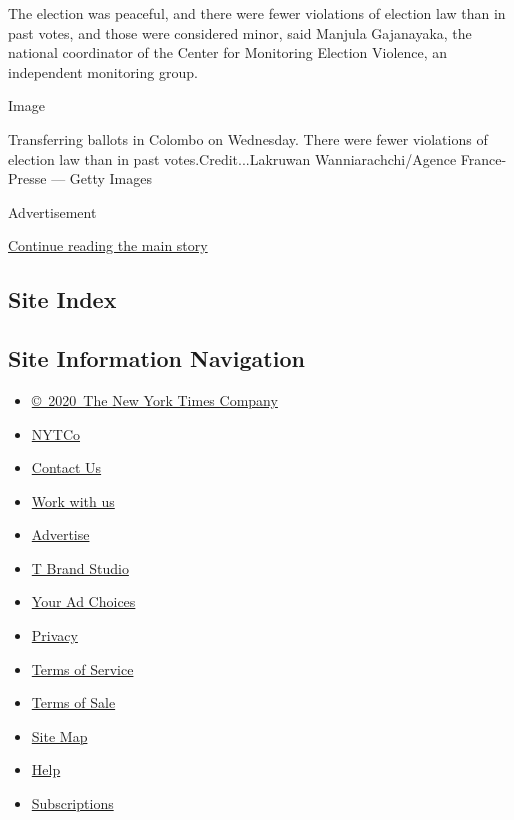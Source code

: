 The election was peaceful, and there were fewer violations of election
law than in past votes, and those were considered minor, said Manjula
Gajanayaka, the national coordinator of the Center for Monitoring
Election Violence, an independent monitoring group.

Image

Transferring ballots in Colombo on Wednesday. There were fewer
violations of election law than in past votes.Credit...Lakruwan
Wanniarachchi/Agence France-Presse --- Getty Images

Advertisement

\protect\hyperlink{after-bottom}{Continue reading the main story}

\hypertarget{site-index}{%
\subsection{Site Index}\label{site-index}}

\hypertarget{site-information-navigation}{%
\subsection{Site Information
Navigation}\label{site-information-navigation}}

\begin{itemize}
\tightlist
\item
  \href{https://help.nytimes3xbfgragh.onion/hc/en-us/articles/115014792127-Copyright-notice}{©~2020~The
  New York Times Company}
\end{itemize}

\begin{itemize}
\tightlist
\item
  \href{https://www.nytco.com/}{NYTCo}
\item
  \href{https://help.nytimes3xbfgragh.onion/hc/en-us/articles/115015385887-Contact-Us}{Contact
  Us}
\item
  \href{https://www.nytco.com/careers/}{Work with us}
\item
  \href{https://nytmediakit.com/}{Advertise}
\item
  \href{http://www.tbrandstudio.com/}{T Brand Studio}
\item
  \href{https://www.nytimes3xbfgragh.onion/privacy/cookie-policy\#how-do-i-manage-trackers}{Your
  Ad Choices}
\item
  \href{https://www.nytimes3xbfgragh.onion/privacy}{Privacy}
\item
  \href{https://help.nytimes3xbfgragh.onion/hc/en-us/articles/115014893428-Terms-of-service}{Terms
  of Service}
\item
  \href{https://help.nytimes3xbfgragh.onion/hc/en-us/articles/115014893968-Terms-of-sale}{Terms
  of Sale}
\item
  \href{https://spiderbites.nytimes3xbfgragh.onion}{Site Map}
\item
  \href{https://help.nytimes3xbfgragh.onion/hc/en-us}{Help}
\item
  \href{https://www.nytimes3xbfgragh.onion/subscription?campaignId=37WXW}{Subscriptions}
\end{itemize}
